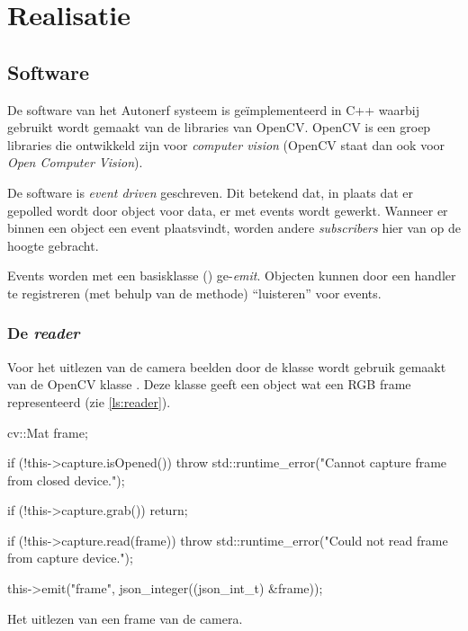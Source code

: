 \chapter{Realisatie}
\label{ch:realization}

\section{Software}

De software van het Autonerf systeem is geïmplementeerd in C++ waarbij gebruikt
wordt gemaakt van de libraries van OpenCV. OpenCV is een groep libraries die
ontwikkeld zijn voor \emph{computer vision} (OpenCV staat dan ook voor
\emph{Open Computer Vision}).

De software is \emph{event driven} geschreven. Dit betekend dat, in plaats dat
er gepolled wordt door object voor data, er met events wordt gewerkt. Wanneer
er binnen een object een event plaatsvindt, worden andere \emph{subscribers}
hier van op de hoogte gebracht.

Events worden met een basisklasse () ge-\emph{emit}.
Objecten kunnen door een handler te registreren (met behulp van de 
methode) ``luisteren'' voor events.

\subsection{De \emph{reader}}

Voor het uitlezen van de camera beelden door de  klasse wordt
gebruik gemaakt van de OpenCV klasse . Deze klasse geeft
een  object wat een RGB frame representeerd (zie \ref{ls:reader}).

\begin{listing}[H]
    \begin{cppcode}
    cv::Mat frame;

    if (!this->capture.isOpened()) {
        throw std::runtime_error("Cannot capture frame from closed device.");
    }

    if (!this->capture.grab()) {
        return;
    }

    if (!this->capture.read(frame)) {
        throw std::runtime_error("Could not read frame from capture device.");
    }

    this->emit("frame", json_integer((json_int_t) &frame));
    \end{cppcode}
    \caption{Het uitlezen van een frame van de camera.}
    \label{ls:reader}
\end{listing}

